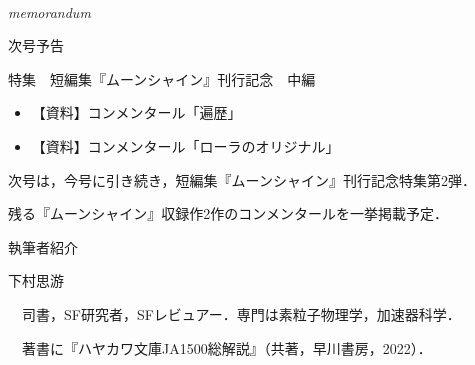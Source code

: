 \documentclass[10pt, a5paper, twoside]{jsarticle}
\theoremstyle{definition}
\begin{document}
	~ %

	\begin{center}

		\Large{\textit{memorandum}}

	\end{center}

	\newpage

	\begin{center}

		{\Large 次号予告}

			\vspace{10mm}

		特集　短編集『ムーンシャイン』刊行記念　中編

			\vspace{3mm}

		\begin{itemize}

			\item 【資料】コンメンタール「遍歴」

				\vspace{3mm}

			\item 【資料】コンメンタール「ローラのオリジナル」

				\vspace{3mm}
		
		\end{itemize}


	\end{center}

	\vspace{15mm}

	\begin{screen}
		
		次号は，今号に引き続き，短編集『ムーンシャイン』刊行記念特集第2弾．

		残る『ムーンシャイン』収録作2作のコンメンタールを一挙掲載予定．

	\end{screen}

	\newpage

	{\large 執筆者紹介}

	\vspace{3mm}

	下村思游

	　司書，SF研究者，SFレビュアー．専門は素粒子物理学，加速器科学．

	　著書に『ハヤカワ文庫JA1500総解説』（共著，早川書房，2022）．
\end{document}
